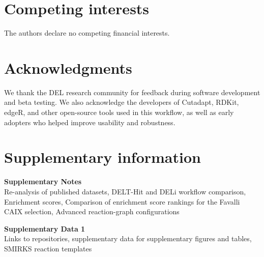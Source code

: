 \section{Competing interests}
The authors declare no competing financial interests.


\section{Acknowledgments}
We thank the DEL research community for feedback during software development and beta testing. We also acknowledge the developers of Cutadapt, RDKit, edgeR, and other open-source tools used in this workflow, as well as early adopters who helped improve usability and robustness.

\section{Supplementary information}
\textbf{Supplementary Notes}\\
Re-analysis of published datasets, DELT-Hit and DELi workflow comparison, Enrichment scores, Comparison of enrichment score rankings for the Favalli CAIX selection, Advanced reaction-graph configurations

\textbf{Supplementary Data 1}\\
Links to repositories, supplementary data for supplementary figures and tables, SMIRKS reaction templates
